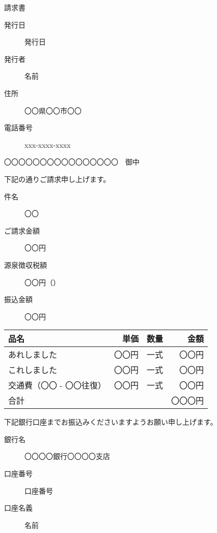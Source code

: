 \documentclass{jlreq}
\newcommand{\請求書}{
    \begin{center}
        \vspace{1\zw}
        {\Huge 請求書}
        \vspace{1\zw}
    \end{center}
}
\newcommand{\御中}[1]{
    \vspace{1\zw}
    #1　御中
    \vspace{1\zw}
}
\newcommand{\発行者}[4]{
    \begin{description}
        \item[発行日] #1
        \item[発行者] #2
        \item[住所] #3
        \item[電話番号] #4
    \end{description}

    \vspace{1\zw}
    \hrulefill
    \vspace{1\zw}
}
\newcommand{\振込先}[3]{
    \vspace{1\zw}
    \hrulefill
    \vspace{1\zw}

    下記銀行口座までお振込みくださいますようお願い申し上げます。
    \vspace{1\zw}
    \begin{description}
        \item[銀行名] #1
        \item[口座番号] #2
        \item[口座名義] #3
    \end{description}
}
\begin{document}
\請求書

\発行者{発行日}{名前}{〇〇県〇〇市〇〇}{xxx-xxxx-xxxx}

\御中{〇〇〇〇〇〇〇〇〇〇〇〇〇〇〇〇}

下記の通りご請求申し上げます。

\begin{description}
    \item[件名] 〇〇
    \item[ご請求金額] 〇〇円
    \item[源泉徴収税額] 〇〇円（）
    \item[振込金額] 〇〇円
\end{description}

\begin{table}
    \centering
    \begin{tabular}{lrrr}
        \toprule
        品名 & 単価 & 数量 & 金額 \\\midrule
        あれしました & 〇〇円 & 一式 & 〇〇円\\
        これしました & 〇〇円 & 一式 & 〇〇円\\
        交通費（〇〇 - 〇〇往復） & 〇〇円 & 一式 & 〇〇円\\ \midrule
        合計 & & & 〇〇〇円\\
        \bottomrule
    \end{tabular}
\end{table}

\振込先{〇〇〇〇銀行〇〇〇〇支店}{口座番号}{名前}
\end{document}
